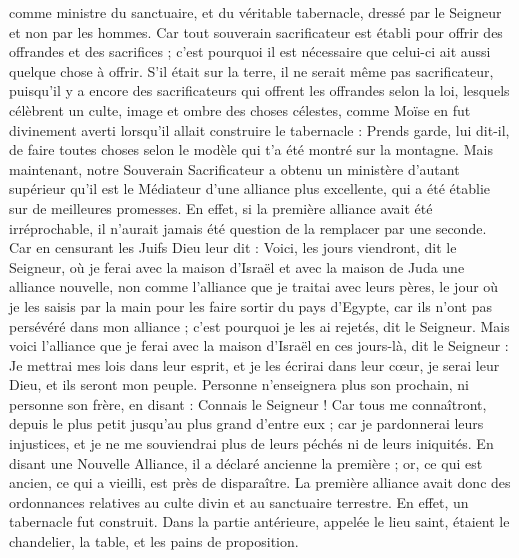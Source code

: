 \begin{multicols}{2}
comme ministre du sanctuaire, et du véritable tabernacle, dressé par le Seigneur et non par les hommes.
Car tout souverain sacrificateur est établi pour offrir des offrandes et des sacrifices ; c'est pourquoi il est nécessaire que celui-ci ait aussi quelque chose à offrir.
S’il était sur la terre, il ne serait même pas sacrificateur, puisqu’il y a encore des sacrificateurs qui offrent les offrandes selon la loi,
lesquels célèbrent un culte, image et ombre des choses célestes, comme Moïse en fut divinement averti lorsqu’il allait construire le tabernacle : Prends garde, lui dit-il, de faire toutes choses selon le modèle qui t'a été montré sur la montagne.
Mais maintenant, notre Souverain Sacrificateur a obtenu un ministère d'autant supérieur qu'il est le Médiateur d'une alliance plus excellente, qui a été établie sur de meilleures promesses.
En effet, si la première alliance avait été irréprochable, il n’aurait jamais été question de la remplacer par une seconde.
Car en censurant les Juifs Dieu leur dit : Voici, les jours viendront, dit le Seigneur, où je ferai avec la maison d'Israël et avec la maison de Juda une alliance nouvelle,
non comme l'alliance que je traitai avec leurs pères, le jour où je les saisis par la main pour les faire sortir du pays d'Egypte, car ils n'ont pas persévéré dans mon alliance ; c'est pourquoi je les ai rejetés, dit le Seigneur.
Mais voici l'alliance que je ferai avec la maison d'Israël en ces jours-là, dit le Seigneur : Je mettrai mes lois dans leur esprit, et je les écrirai dans leur cœur, je serai leur Dieu, et ils seront mon peuple.
Personne n'enseignera plus son prochain, ni personne son frère, en disant : Connais le Seigneur ! Car tous me connaîtront, depuis le plus petit jusqu'au plus grand d'entre eux ;
car je pardonnerai leurs injustices, et je ne me souviendrai plus de leurs péchés ni de leurs iniquités.
En disant une Nouvelle Alliance, il a déclaré ancienne la première ; or, ce qui est ancien, ce qui a vieilli, est près de disparaître.
\VerseOne{}La première alliance avait donc des ordonnances relatives au culte divin et au sanctuaire terrestre.
En effet, un tabernacle fut construit. Dans la partie antérieure, appelée le lieu saint, étaient le chandelier, la table, et les pains de proposition.

\end{multicols}
